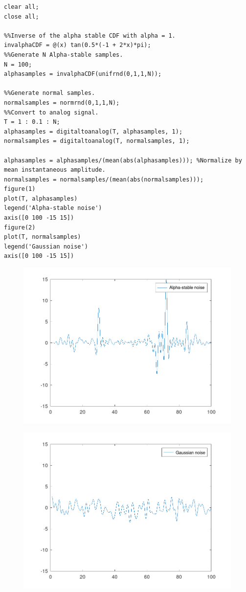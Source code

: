 \documentclass{article}
\begin{document}
\begin{verbatim}
clear all;
close all;

%%Inverse of the alpha stable CDF with alpha = 1.
invalphaCDF = @(x) tan(0.5*(-1 + 2*x)*pi);
%%Generate N Alpha-stable samples.
N = 100;
alphasamples = invalphaCDF(unifrnd(0,1,1,N));

%%Generate normal samples.
normalsamples = normrnd(0,1,1,N);
%%Convert to analog signal.
T = 1 : 0.1 : N;
alphasamples = digitaltoanalog(T, alphasamples, 1);
normalsamples = digitaltoanalog(T, normalsamples, 1);

alphasamples = alphasamples/(mean(abs(alphasamples))); %Normalize by mean instantaneous amplitude.
normalsamples = normalsamples/(mean(abs(normalsamples)));
figure(1)
plot(T, alphasamples)
legend('Alpha-stable noise')
axis([0 100 -15 15])
figure(2)
plot(T, normalsamples)
legend('Gaussian noise')
axis([0 100 -15 15])

\end{verbatim}

\begin{figure}
  \includegraphics[width=\linewidth]{alphastablenoise.png}
\end{figure}


\begin{figure}
  \includegraphics[width=\linewidth]{gaussiannoise.png}
\end{figure}
\end{document}
